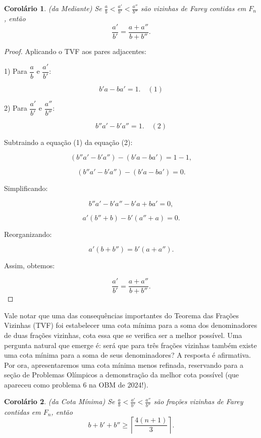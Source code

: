 \documentclass{hipatia}
\newtheorem*{corollary*}{Corolário} %
\theoremstyle{definition} %
\begin{document}
\begin{corollary*} (da Mediante)
Se $\frac{a}{b}<\frac{a'}{b'}<\frac{a''}{b''}$ são vizinhas de Farey contidas em \(F_n\), então
\[
\frac{a'}{b'}=\frac{a+a''}{b+b''}.
\]

\end{corollary*}

\begin{proof} Aplicando o TVF aos pares adjacentes:

1) Para \(\dfrac{a}{b}\) e \(\dfrac{a'}{b'}\):

\[
b'a - ba' = 1. \quad (1)
\]

2) Para \(\dfrac{a'}{b'}\) e \(\dfrac{a''}{b''}\):

\[
b''a' - b'a'' = 1. \quad (2)
\]

Subtraindo a equação (1) da equação (2):

\[
(b''a' - b'a'') - (b'a - ba') = 1 - 1,
\]

\[
(b''a' - b'a'') - (b'a - ba') = 0.
\]

Simplificando:

\[
b''a' - b'a'' - b'a + ba' = 0,
\]

\[
a'(b'' + b) - b'(a'' + a) = 0.
\]

Reorganizando:

\[
a'(b + b'') = b'(a + a'').
\]

Assim, obtemos:

\[
\dfrac{a'}{b'} = \dfrac{a + a''}{b + b''}.
\]


\end{proof}

Vale notar que uma das consequências importantes do Teorema das Frações Vizinhas (TVF) foi estabelecer uma cota mínima para a soma dos denominadores de duas frações vizinhas, cota essa que se verifica ser a melhor possível. Uma pergunta natural que emerge é: será que para três frações vizinhas também existe uma cota mínima para a soma de seus denominadores? A resposta é afirmativa. Por ora, apresentaremos uma cota mínima menos refinada, reservando para a seção de Problemas Olímpicos a demonstração da melhor cota possível (que apareceu como problema 6 na OBM de 2024!).

\begin{corollary*} (da Cota Mínima)
Se $\frac{a}{b}<\frac{a'}{b'}<\frac{a''}{b''}$ são frações vizinhas de Farey contidas em \(F_n\), então
\[
b+b'+b''\geq \left\lceil \frac{4(n+1)}{3} \right\rceil.
\]
\end{corollary*}
\end{document}
